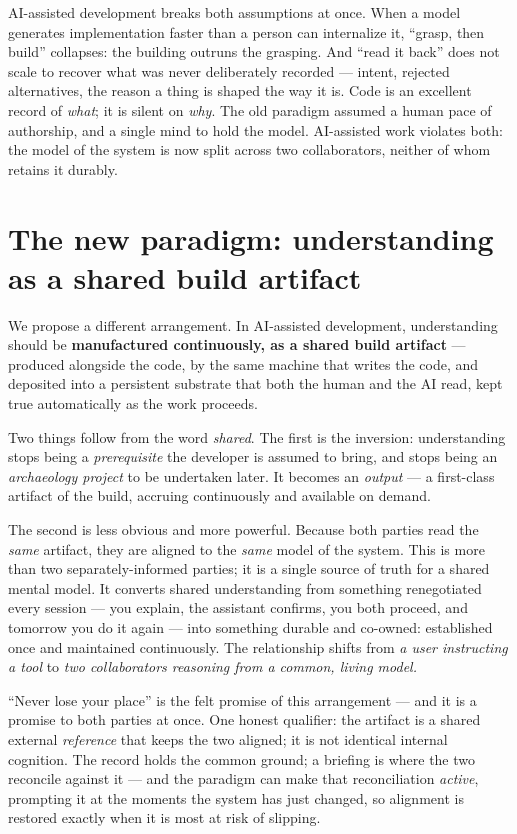 \documentclass[11pt]{article}
\begin{document}
AI-assisted development breaks both assumptions at once. When a model generates implementation
faster than a person can internalize it, ``grasp, then build'' collapses: the building outruns the
grasping. And ``read it back'' does not scale to recover what was never deliberately recorded ---
intent, rejected alternatives, the reason a thing is shaped the way it is. Code is an excellent
record of \emph{what}; it is silent on \emph{why}. The old paradigm assumed a human pace of
authorship, and a single mind to hold the model. AI-assisted work violates both: the model of the
system is now split across two collaborators, neither of whom retains it durably.

\section{The new paradigm: understanding as a shared build artifact}

We propose a different arrangement. In AI-assisted development, understanding should be
\textbf{manufactured continuously, as a shared build artifact} --- produced alongside the code, by
the same machine that writes the code, and deposited into a persistent substrate that both the
human and the AI read, kept true automatically as the work proceeds.

Two things follow from the word \emph{shared}. The first is the inversion: understanding stops
being a \emph{prerequisite} the developer is assumed to bring, and stops being an \emph{archaeology
project} to be undertaken later. It becomes an \emph{output} --- a first-class artifact of the
build, accruing continuously and available on demand.

The second is less obvious and more powerful. Because both parties read the \emph{same} artifact,
they are aligned to the \emph{same} model of the system. This is more than two separately-informed
parties; it is a single source of truth for a shared mental model. It converts shared understanding
from something renegotiated every session --- you explain, the assistant confirms, you both proceed,
and tomorrow you do it again --- into something durable and co-owned: established once and maintained
continuously. The relationship shifts from \emph{a user instructing a tool} to \emph{two
collaborators reasoning from a common, living model.}

``Never lose your place'' is the felt promise of this arrangement --- and it is a promise to both
parties at once. One honest qualifier: the artifact is a shared external \emph{reference} that keeps
the two aligned; it is not identical internal cognition. The record holds the common ground; a
briefing is where the two reconcile against it --- and the paradigm can make that reconciliation
\emph{active}, prompting it at the moments the system has just changed, so alignment is restored
exactly when it is most at risk of slipping.
\end{document}
